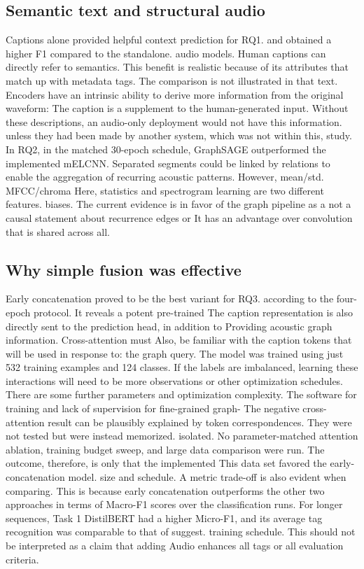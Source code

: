 \documentclass[10pt,twocolumn,letterpaper]{article}
\begin{document}
\subsection{Semantic text and structural audio}
Captions alone provided helpful context prediction for RQ1. and obtained a higher F1 compared to the standalone. audio models. Human captions can directly refer to semantics. This benefit is realistic because of its attributes that match up with metadata tags. The comparison is not illustrated in that text. Encoders have an intrinsic ability to derive more information from the original waveform: The caption is a supplement to the human-generated input. Without these descriptions, an audio-only deployment would not have this information. unless they had been made by another system, which was not within this, study. In RQ2, in the matched 30-epoch schedule, GraphSAGE outperformed the implemented mELCNN. Separated segments could be linked by relations to enable the aggregation of recurring acoustic patterns. However, mean/std. MFCC/chroma Here, statistics and spectrogram learning are two different features. biases. The current evidence is in favor of the graph pipeline as a not a causal statement about recurrence edges or It has an advantage over convolution that is shared across all.

\subsection{Why simple fusion was effective}
Early concatenation proved to be the best variant for RQ3. according to the four-epoch protocol. It reveals a potent pre-trained The caption representation is also directly sent to the prediction head, in addition to Providing acoustic graph information. Cross-attention must Also, be familiar with the caption tokens that will be used in response to: the graph query. The model was trained using just 532 training examples and 124 classes. If the labels are imbalanced, learning these interactions will need to be more observations or other optimization schedules. There are some further parameters and optimization complexity. The software for training and lack of supervision for fine-grained graph- The negative cross-attention result can be plausibly explained by token correspondences. They were not tested but were instead memorized. isolated. No parameter-matched attention ablation, training budget sweep, and large data comparison were run. The outcome, therefore, is only that the implemented This data set favored the early-concatenation model. size and schedule. A metric trade-off is also evident when comparing. This is because early concatenation outperforms the other two approaches in terms of Macro-F1 scores over the classification runs. For longer sequences, Task 1 DistilBERT had a higher Micro-F1, and its average tag recognition was comparable to that of suggest. training schedule. This should not be interpreted as a claim that adding Audio enhances all tags or all evaluation criteria.
\end{document}
